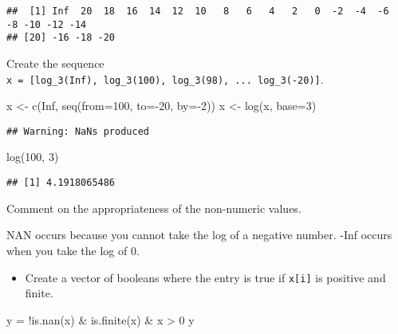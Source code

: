\documentclass[
]{article}
\newenvironment{Shaded}{\begin{snugshade}}{\end{snugshade}}
\newcommand{\AttributeTok}[1]{\textcolor[rgb]{0.77,0.63,0.00}{#1}}
\newcommand{\ConstantTok}[1]{\textcolor[rgb]{0.00,0.00,0.00}{#1}}
\newcommand{\DecValTok}[1]{\textcolor[rgb]{0.00,0.00,0.81}{#1}}
\newcommand{\FunctionTok}[1]{\textcolor[rgb]{0.00,0.00,0.00}{#1}}
\newcommand{\NormalTok}[1]{#1}
\newcommand{\OtherTok}[1]{\textcolor[rgb]{0.56,0.35,0.01}{#1}}
\newcommand{\SpecialCharTok}[1]{\textcolor[rgb]{0.00,0.00,0.00}{#1}}
\providecommand{\tightlist}{%
  \setlength{\itemsep}{0pt}\setlength{\parskip}{0pt}}
\begin{document}
\begin{verbatim}
##  [1] Inf  20  18  16  14  12  10   8   6   4   2   0  -2  -4  -6  -8 -10 -12 -14
## [20] -16 -18 -20
\end{verbatim}

Create the sequence
\texttt{x\ =\ {[}log\_3(Inf),\ log\_3(100),\ log\_3(98),\ ...\ log\_3(-20){]}}.

\begin{Shaded}
\begin{Highlighting}[]
\NormalTok{x }\OtherTok{\textless{}{-}} \FunctionTok{c}\NormalTok{(}\ConstantTok{Inf}\NormalTok{, }\FunctionTok{seq}\NormalTok{(}\AttributeTok{from=}\DecValTok{100}\NormalTok{, }\AttributeTok{to=}\SpecialCharTok{{-}}\DecValTok{20}\NormalTok{, }\AttributeTok{by=}\SpecialCharTok{{-}}\DecValTok{2}\NormalTok{))}
\NormalTok{x }\OtherTok{\textless{}{-}} \FunctionTok{log}\NormalTok{(x, }\AttributeTok{base=}\DecValTok{3}\NormalTok{)}
\end{Highlighting}
\end{Shaded}

\begin{verbatim}
## Warning: NaNs produced
\end{verbatim}

\begin{Shaded}
\begin{Highlighting}[]
\FunctionTok{log}\NormalTok{(}\DecValTok{100}\NormalTok{, }\DecValTok{3}\NormalTok{)}
\end{Highlighting}
\end{Shaded}

\begin{verbatim}
## [1] 4.1918065486
\end{verbatim}

Comment on the appropriateness of the non-numeric values.

NAN occurs because you cannot take the log of a negative number. -Inf
occurs when you take the log of 0.

\begin{itemize}
\tightlist
\item
  Create a vector of booleans where the entry is true if
  \texttt{x{[}i{]}} is positive and finite.
\end{itemize}

\begin{Shaded}
\begin{Highlighting}[]
\NormalTok{y }\OtherTok{=} \SpecialCharTok{!}\FunctionTok{is.nan}\NormalTok{(x) }\SpecialCharTok{\&} \FunctionTok{is.finite}\NormalTok{(x) }\SpecialCharTok{\&}\NormalTok{ x }\SpecialCharTok{\textgreater{}} \DecValTok{0}
\NormalTok{y}
\end{Highlighting}
\end{Shaded}
\end{document}
